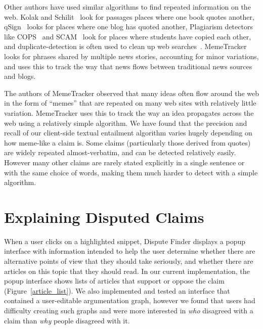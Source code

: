 \documentclass{www2010-submission}
\newcommand{\todo}[1]{}
\begin{document}
Other authors have used similar algorithms to find repeated information on the web. Kolak and Schilit~\cite{Kolak2008} look for passages places where one book quotes another, qSign~\cite{Kim2009} looks for places where one blog has quoted another, Plagiarism detectors like COPS~\cite{COPS} and SCAM~\cite{SCAM} look for places where students have copied each other, and duplicate-detection is often used to clean up web searches~\cite{web-copy-detect}. MemeTracker~\cite{Backstrom2009} looks for phrases shared by multiple news stories, accounting for minor variations, and uses this to track the way that news flows between traditional news sources and blogs.

The authors of MemeTracker observed that many ideas often flow around the web in the form of ``memes'' that are repeated on many web sites with relatively little variation. MemeTracker uses this to track the way an idea propagates across the web using a relatively simple algorithm. We have found that the precision and recall of our client-side textual entailment algorithm varies hugely depending on how meme-like a claim is. Some claims (particularly those derived from quotes) are widely repeated almost-verbatim, and can be detected relatively easily. However many other claims are rarely stated explicitly in a single sentence or with the same choice of words, making them much harder to detect with a simple algorithm.

\todo{Give an example of a good meme}

\todo{Talk about what dispute finder does, and how it differs - maybe by moving this into the main system section}
\todo{Cite plagarism detection}
\todo{Talk about how our algorithm looks for key terms used in disputed claims}
\todo{Talk about how our first pass NLP algo is rather like }


\section{Explaining Disputed Claims}

When a user clicks on a highlighted snippet, Dispute Finder displays a popup interface with information intended to help the user determine whether there are alternative points of view that they should take seriously, and whether there are articles on this topic that they should read. In our current implementation, the popup interface shows lists of articles that support or oppose the claim (Figure~\ref{article_list}). We also implemented and tested an interface that contained a user-editable argumentation graph, however we found that users had difficulty creating such graphs and were more interested in {\it who} disagreed with a claim than {\it why} people disagreed with it.
\end{document}
